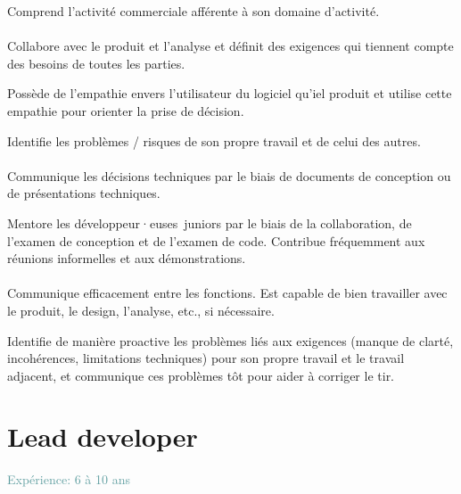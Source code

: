 \documentclass[a4paper, french, openany, 12pt]{book}
\newcommand\wis[1]{\textcolor{MidnightBlue}{\textbf{\bsc{Wis-{#1}}}}}
\newcommand\cha[1]{\textcolor{OliveGreen}{\textbf{\bsc{Cha-{#1}}}}}
\newcommand\xp[1]{\textcolor{CadetBlue}{Expérience: {#1} ans}}
\newcommand\devs{développeur·euses}
\begin{document}
\begin{multicols}{2}
  Comprend l'activité commerciale afférente à son domaine d'activité.

  \subsubsection*{\wis{TODO}}

  Collabore avec le produit et l'analyse et définit des exigences qui tiennent compte des besoins de toutes les parties.

  Possède de l'empathie envers l'utilisateur du logiciel qu'iel produit et utilise cette empathie pour orienter la prise 
  de décision.

  Identifie les problèmes / risques de son propre travail et de celui des autres.

  \subsubsection*{\cha{TODO}}

  Communique les décisions techniques par le biais de documents de conception ou de présentations techniques.

  Mentore les \devs\ juniors par le biais de la collaboration, de l'examen de conception et de l'examen de code. 
  Contribue fréquemment aux réunions informelles et aux démonstrations.

  \subsubsection*{\cha{TODO}}

  Communique efficacement entre les fonctions.
  Est capable de bien travailler avec le produit, le design, l'analyse, etc., si nécessaire.

  Identifie de manière proactive les problèmes liés aux exigences (manque de clarté, incohérences, limitations techniques)
  pour son propre travail et le travail adjacent, et communique ces problèmes tôt pour aider à corriger le tir.

\end{multicols}


\chapter{Lead developer}

\xp{6 à 10}
\end{document}
